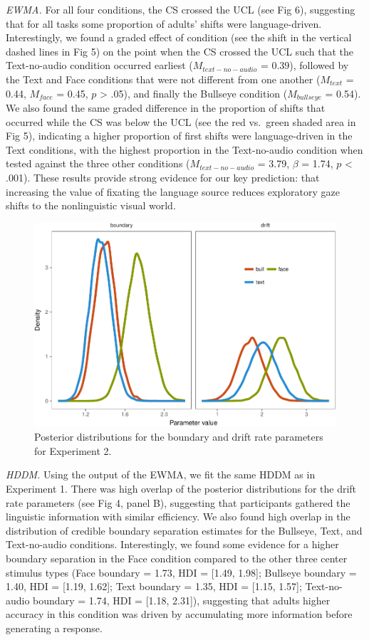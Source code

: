 \documentclass[english,man]{apa6}
\theoremstyle{definition}
\theoremstyle{definition}
\theoremstyle{definition}
\theoremstyle{remark}
\begin{document}
\emph{EWMA.} For all four conditions, the CS crossed the UCL (see Fig
6), suggesting that for all tasks some proportion of adults' shifts were
language-driven. Interestingly, we found a graded effect of condition
(see the shift in the vertical dashed lines in Fig 5) on the point when
the CS crossed the UCL such that the Text-no-audio condition occurred
earliest (\(M_{text-no-audio}\) = 0.39), followed by the Text and Face
conditions that were not different from one another (\(M_{text}\) =
0.44, \(M_{face}\) = 0.45, \(p\) \textgreater{} .05), and finally the
Bullseye condition (\(M_{bullseye}\) = 0.54). We also found the same
graded difference in the proportion of shifts that occurred while the CS
was below the UCL (see the red vs.~green shaded area in Fig 5),
indicating a higher proportion of first shifts were language-driven in
the Text conditions, with the highest proportion in the Text-no-audio
condition when tested against the three other conditions
(\(M_{text-no-audio}\) = 3.79, \(\beta\) = 1.74, \(p\) \textless{}
.001). These results provide strong evidence for our key prediction:
that increasing the value of fixating the language source reduces
exploratory gaze shifts to the nonlinguistic visual world.

\begin{figure}[tb]

{\centering \includegraphics[width=0.8\linewidth]{figs/text-hddm-plot-1} 

}

\caption{Posterior distributions for the boundary and drift rate parameters for Experiment 2.}\label{fig:text-hddm-plot}
\end{figure}

\emph{HDDM.} Using the output of the EWMA, we fit the same HDDM as in
Experiment 1. There was high overlap of the posterior distributions for
the drift rate parameters (see Fig 4, panel B), suggesting that
participants gathered the linguistic information with similar
efficiency. We also found high overlap in the distribution of credible
boundary separation estimates for the Bullseye, Text, and Text-no-audio
conditions. Interestingly, we found some evidence for a higher boundary
separation in the Face condition compared to the other three center
stimulus types (Face boundary = 1.73, HDI = {[}1.49, 1.98{]}; Bullseye
boundary = 1.40, HDI = {[}1.19, 1.62{]}; Text boundary = 1.35, HDI =
{[}1.15, 1.57{]}; Text-no-audio boundary = 1.74, HDI = {[}1.18,
2.31{]}), suggesting that adults higher accuracy in this condition was
driven by accumulating more information before generating a response.
\end{document}
